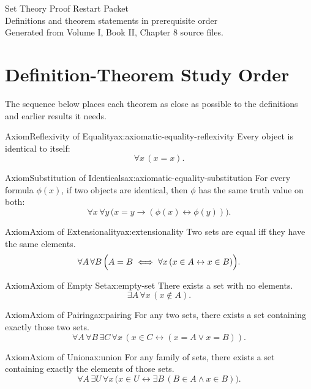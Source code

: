 \documentclass[11pt]{article}
\begin{document}
\begin{center}
{\LARGE Set Theory Proof Restart Packet}\\[0.35em]
{\large Definitions and theorem statements in prerequisite order}\\[0.45em]
{\small Generated from Volume I, Book II, Chapter 8 source files.}
\end{center}

\tableofcontents
\newpage

\section{Definition-Theorem Study Order}
The sequence below places each theorem as close as possible to the definitions and earlier results it needs.

\begin{studyblock}{Axiom}{Reflexivity of Equality}{ax:axiomatic-equality-reflexivity}
Every object is identical to itself:
\[
  \forall x\,(x=x).
\]
\end{studyblock}
\begin{studyblock}{Axiom}{Substitution of Identicals}{ax:axiomatic-equality-substitution}
For every formula \(\phi(x)\), if two objects are identical, then \(\phi\) has
the same truth value on both:
\[
  \forall x\,\forall y\,
  \bigl(x=y\to(\phi(x)\leftrightarrow\phi(y))\bigr).
\]
\end{studyblock}
\begin{studyblock}{Axiom}{Axiom of Extensionality}{ax:extensionality}
Two sets are equal iff they have the same elements.
\[
\forall A \, \forall B \,
\Bigl( A = B \iff \forall x \, (x \in A \leftrightarrow x \in B) \Bigr).
\]
\end{studyblock}
\begin{studyblock}{Axiom}{Axiom of Empty Set}{ax:empty-set}
There exists a set with no elements.
\[
\exists A \, \forall x \, (x \notin A).
\]
\end{studyblock}
\begin{studyblock}{Axiom}{Axiom of Pairing}{ax:pairing}
For any two sets, there exists a set containing exactly those two sets.
\[
\forall A \, \forall B \, \exists C \,
\forall x \, (x \in C \leftrightarrow (x = A \lor x = B)).
\]
\end{studyblock}
\begin{studyblock}{Axiom}{Axiom of Union}{ax:union}
For any family of sets, there exists a set containing exactly the elements of
those sets.
\[
\forall A \, \exists U \,
\forall x \,
\bigl( x \in U \leftrightarrow \exists B \, (B \in A \land x \in B) \bigr).
\]
\end{studyblock}
\end{document}
